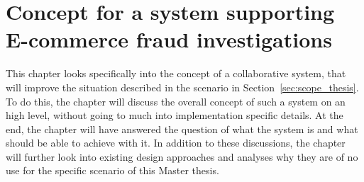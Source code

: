 
\chapter{Concept for a system supporting \gls{E-commerce} fraud investigations} %
\label{cha:system_concept}

This chapter looks specifically into the concept of a collaborative system, that will improve the situation described in the scenario in Section~\ref{sec:scope_thesis}. To do this, the chapter will discuss the overall concept of such a system on an high level, without going to much into implementation specific details. At the end, the chapter will have answered the question of what the system is and what should be able to achieve with it. In addition to these discussions, the chapter will further look into existing design approaches and analyses why they are of no use for the specific scenario of this Master thesis.











